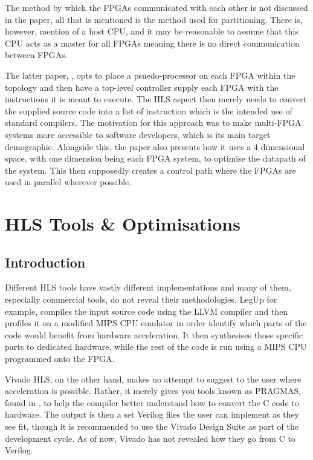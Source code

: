 The method by which the FPGAs communicated with each other is not discussed in the paper, all that is mentioned is the method used for partitioning. There is, however, mention of a host CPU, and it may be reasonable to assume that this CPU acts as a master for all FPGAs meaning there is no direct communication between FPGAs.

The latter paper, \cite{707888}, opts to place a psuedo-processor on each FPGA within the topology and then have a top-level controller supply each FPGA with the instructions it is meant to execute. The HLS aspect then merely needs to convert the supplied source code into a list of instruction which is the intended use of standard compilers. The motivation for this approach was to make multi-FPGA systems more accessible to software developers, which is its main target demographic. Alongside this, the paper also presents how it uses a 4 dimensional space, with one dimension being each FPGA system, to optimise the datapath of the system. This then supposedly creates a control path where the FPGAs are used in parallel wherever possible.

\section{HLS Tools \& Optimisations}
\label{sec:bg:hls}

\subsection{Introduction}

Different HLS tools have vastly different implementations \cite{7368920} and many of them, especially commercial tools, do not reveal their methodologies. LegUp\cite{legup} for example, compiles the input source code using the LLVM compiler and then profiles it on a modified MIPS CPU emulator in order identify which parts of the code would benefit from hardware acceleration. It then synthesises those specific parts to dedicated hardware, while the rest of the code is run using a MIPS CPU programmed onto the FPGA.

Vivado HLS, on the other hand, makes no attempt to suggest to the user where acceleration is possible. Rather, it merely gives you tools known as PRAGMAS, found in \cite{vivado-optmisation-manual}, to help the compiler better understand how to convert the C code to hardware. The output is then a set Verilog files the user can implement as they see fit, though it is recommended to use the Vivado Design Suite \cite{vivado-design-suite-manual} as part of the development cycle. As of now, Vivado has not revealed how they go from C to Verilog.

